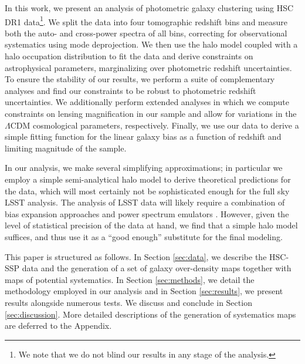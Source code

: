 \documentclass[a4paper,11pt]{article}
\begin{document}
  In this work, we present an analysis of photometric galaxy clustering using HSC DR1 data\footnote{We note that we do not blind our results in any stage of the analysis.}. We split the data into four tomographic redshift bins and measure both the auto- and cross-power spectra of all bins, correcting for observational systematics using mode deprojection. We then use the halo model coupled with a halo occupation distribution to fit the data and derive constraints on astrophysical parameters, marginalizing over photometric redshift uncertainties. To ensure the stability of our results, we perform a suite of complementary analyses and find our constraints to be robust to photometric redshift uncertainties. We additionally perform extended analyses in which we compute constraints on lensing magnification in our sample and allow for variations in the $\Lambda$CDM cosmological parameters, respectively. Finally, we use our data to derive a simple fitting function for the linear galaxy bias as a function of redshift and limiting magnitude of the sample.

  In our analysis, we make several simplifying approximations; in particular we employ a simple semi-analytical halo model to derive theoretical predictions for the data, which will most certainly not be sophisticated enough for the full sky LSST analysis. The analysis of LSST data will likely require  a combination of  bias expansion approaches \cite{0902.0991,1402.5916,1611.09787,1910.07097} and power spectrum emulators \cite{1804.05865,1705.03388}. However, given the level of statistical precision of the data at hand, we find that a simple halo model suffices, and thus use it as a ``good enough'' substitute for the final modeling.

  This paper is structured as follows. In Section \ref{sec:data}, we describe the HSC-SSP data and the generation of a set of galaxy over-density maps together with maps of potential systematics. In Section \ref{sec:methods}, we detail the methodology employed in our analysis and in Section \ref{sec:results}, we present results alongside numerous tests. We discuss and conclude in Section \ref{sec:discussion}. More detailed descriptions of the generation of systematics maps are deferred to the Appendix. 
\end{document}
